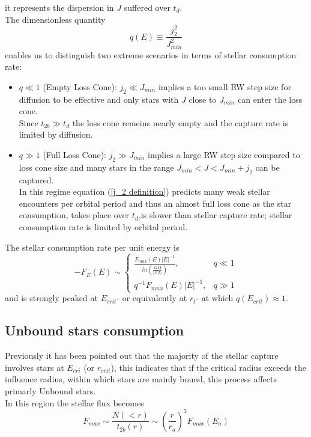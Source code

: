 it represents the dispersion in $J$ suffered over $t_d$.\\The dimensionless quantity
\begin{equation}
    q(E)\equiv\frac{j_2^2}{J_{min}^2}
\end{equation}
enables us to distinguish two extreme scenarios in terms of stellar consumption rate:
\begin{itemize}
  \item  \(q \ll 1\) (Empty Loss Cone): $j_2\ll J_{min}$ implies a too small RW step size for diffusion to be effective and only stars with $J$ close to $J_{min}$ can enter the loss cone.\\Since $t_{2b}\gg t_d$ the loss cone remeins nearly empty and the capture rate is limited by diffusion.
  \item  \(q \gg 1\) (Full Loss Cone): $j_2\gg J_{min}$ implies a large RW step size compared to loss cone size and many stars in the range $J_{min}<J<J_{min}+j_2$ can be captured.\\In this regime equation (\ref{j_2 definition}) predicts many weak stellar encounters per orbital period and thus an almost full loss cone as the star consumption, takes place over $t_d$,is slower than stellar capture rate; stellar consumption rate is limited by orbital period.
\end{itemize}

The stellar consumption rate per unit energy is
\begin{equation}  
-F_E(E) \sim
\begin{cases}
\frac{F_{max}(E)|E|^{-1}}{ln\left(\frac{GM}{|E|r_t}\right)}, & q \ll 1 \\
q^{-1}F_{max}(E)|E|^{-1},   & q \gg 1
\end{cases}
\end{equation}
and is strongly peaked at $E_{crit}$- or equivalently at $r_t$- at which $q(E_{crit})\approx1$.

\subsection{Unbound stars consumption}
Previously it has been pointed out that the majority of the stellar capture involves stars at $E_{cri}$ (or $r_{crit}$), this indicates that if the critical radius exceeds the influence radius, within which stars are mainly bound, this process affects primarly Unbound stars.\\In this region the stellar flux becomes
\begin{equation}
    F_{max}\sim \frac{N(<r)}{t_{2b}(r)}\sim \left(\frac{r}{r_a}\right)^3 F_{max}(E_a)
\end{equation}










